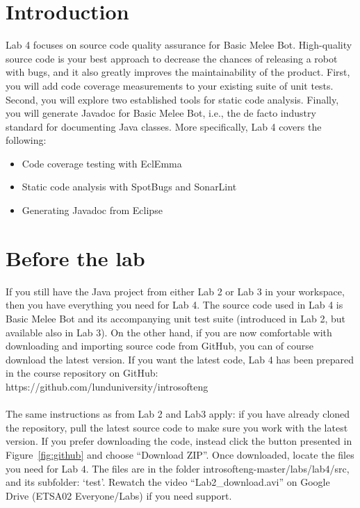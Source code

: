 \documentclass{scrreprt}
\begin{document}
\chapter{Introduction}
Lab 4 focuses on source code quality assurance for Basic Melee Bot. High-quality source code is your best approach to decrease the chances of releasing a robot with bugs, and it also greatly improves the maintainability of the product. First, you will add code coverage measurements to your existing suite of unit tests. Second, you will explore two established tools for static code analysis. Finally, you will generate Javadoc for Basic Melee Bot, i.e., the de facto industry standard for documenting Java classes. More specifically, Lab 4 covers the following:

\begin{itemize}
\item Code coverage testing with EclEmma
\item Static code analysis with SpotBugs and SonarLint
\item Generating Javadoc from Eclipse
\end{itemize}

\chapter{Before the lab}
If you still have the Java project from either Lab 2 or Lab 3 in your workspace, then you have everything you need for Lab 4. The source code used in Lab 4 is Basic Melee Bot and its accompanying unit test suite (introduced in Lab 2, but available also in Lab 3). On the other hand, if you are now comfortable with downloading and importing source code from GitHub, you can of course download the latest version. If you want the latest code, Lab 4 has been prepared in the course repository on GitHub:\\https://github.com/lunduniversity/introsofteng\\\\
The same instructions as from Lab 2 and Lab3 apply: if you have already cloned the repository, pull the latest source code to make sure you work with the latest version. If you prefer downloading the code, instead click the button presented in Figure~\ref{fig:github} and choose ``Download ZIP''. Once downloaded, locate the files you need for Lab 4. The files are in the folder introsofteng-master/labs/lab4/src, and its subfolder: `test'. Rewatch the video ``Lab2_download.avi'' on Google Drive (ETSA02 Everyone/Labs) if you need support.
\end{document}

